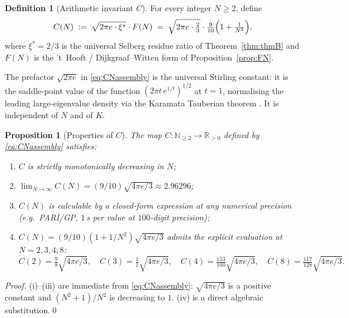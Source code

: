 \documentclass[11pt,a4paper,reqno]{amsart}
\newtheorem{proposition}[theorem]{Proposition}
\theoremstyle{definition}
\newtheorem{definition}[theorem]{Definition}
\newcommand{\RR}{\mathbb{R}}
\newcommand{\NN}{\mathbb{N}}
\newcommand{\xis}{\xi^{*}}
\newcommand{\Cinv}{C}
\begin{document}
\begin{definition}[Arithmetic invariant $\Cinv$]\label{def:CN}
For every integer $N\ge 2$, define
\begin{equation}\label{eq:CNassembly}
   \Cinv(N) \;:=\; \sqrt{2\pi e \cdot \xis} \cdot F(N)
            \;=\; \sqrt{2\pi e \cdot \tfrac{2}{3}} \cdot \tfrac{9}{10}\Bigl(1 + \tfrac{1}{N^2}\Bigr),
\end{equation}
where $\xis=2/3$ is the universal Selberg residue ratio of
Theorem~\ref{thm:thmB} and $F(N)$ is the 't~Hooft / Dijkgraaf--Witten form of
Proposition~\ref{prop:FN}.
\end{definition}

The prefactor $\sqrt{2\pi e}$ in \eqref{eq:CNassembly} is the universal
Stirling constant: it is the saddle-point value of the function
$(2\pi t\,e^{1/t})^{1/2}$ at $t=1$, normalising the leading large-eigenvalue
density via the Karamata Tauberian theorem
\cite[\S2]{Vassilevich2003}.  It is independent of $N$ and of $K$.

\begin{proposition}[Properties of $\Cinv$]\label{prop:Cprops}
The map $\Cinv:\NN_{\ge 2}\to\RR_{>0}$ defined by \eqref{eq:CNassembly}
satisfies:
\begin{enumerate}[label=\textup{(\roman*)},leftmargin=2em]
  \item $\Cinv$ is strictly monotonically decreasing in $N$;
  \item $\lim_{N\to\infty}\Cinv(N) = (9/10)\sqrt{4\pi e/3} \approx 2.96296$;
  \item $\Cinv(N)$ is calculable by a closed-form expression at any
        numerical precision (e.g.\ PARI/GP, $1$\,s per value at $100$-digit
        precision);
  \item $\Cinv(N) = (9/10)(1+1/N^2)\sqrt{4\pi e/3}$ admits the explicit
        evaluation at $N=2,3,4,8$:
        \[
          \Cinv(2) = \tfrac{9}{8}\sqrt{4\pi e/3},\quad
          \Cinv(3) = \tfrac{1}{1}\sqrt{4\pi e/3},\quad
          \Cinv(4) = \tfrac{153}{160}\sqrt{4\pi e/3},\quad
          \Cinv(8) = \tfrac{117}{128}\sqrt{4\pi e/3}.
        \]
\end{enumerate}
\end{proposition}

\begin{proof}
(i)--(iii) are immediate from \eqref{eq:CNassembly}: $\sqrt{4\pi e/3}$ is a
positive constant and $(N^2+1)/N^2$ is decreasing to $1$.  (iv) is a direct
algebraic substitution.\qed
\end{proof}
\end{document}
